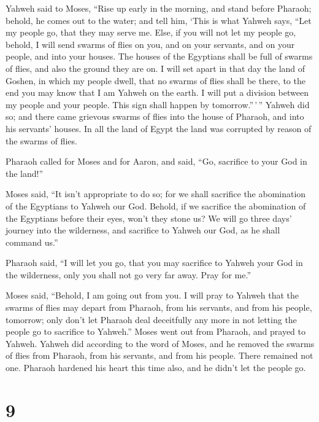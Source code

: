  Yahweh said to Moses, ``Rise up early in the morning,
and stand before Pharaoh; behold, he comes out to the water; and tell
him, `This is what Yahweh says, ``Let my people go, that they may serve
me.  Else, if you will not let my people go, behold, I
will send swarms of flies on you, and on your servants, and on your
people, and into your houses. The houses of the Egyptians shall be full
of swarms of flies, and also the ground they are on.  I
will set apart in that day the land of Goshen, in which my people dwell,
that no swarms of flies shall be there, to the end you may know that I
am Yahweh on the earth.  I will put a division between my
people and your people. This sign shall happen by tomorrow.''\,'\,''
 Yahweh did so; and there came grievous swarms of flies
into the house of Pharaoh, and into his servants' houses. In all the
land of Egypt the land was corrupted by reason of the swarms of flies.

 Pharaoh called for Moses and for Aaron, and said, ``Go,
sacrifice to your God in the land!''

 Moses said, ``It isn't appropriate to do so; for we
shall sacrifice the abomination of the Egyptians to Yahweh our God.
Behold, if we sacrifice the abomination of the Egyptians before their
eyes, won't they stone us?  We will go three days'
journey into the wilderness, and sacrifice to Yahweh our God, as he
shall command us.''

 Pharaoh said, ``I will let you go, that you may
sacrifice to Yahweh your God in the wilderness, only you shall not go
very far away. Pray for me.''

 Moses said, ``Behold, I am going out from you. I will
pray to Yahweh that the swarms of flies may depart from Pharaoh, from
his servants, and from his people, tomorrow; only don't let Pharaoh deal
deceitfully any more in not letting the people go to sacrifice to
Yahweh.''  Moses went out from Pharaoh, and prayed to
Yahweh.  Yahweh did according to the word of Moses, and
he removed the swarms of flies from Pharaoh, from his servants, and from
his people. There remained not one.  Pharaoh hardened his
heart this time also, and he didn't let the people go.

\hypertarget{section-8}{%
\section{9}\label{section-8}}

